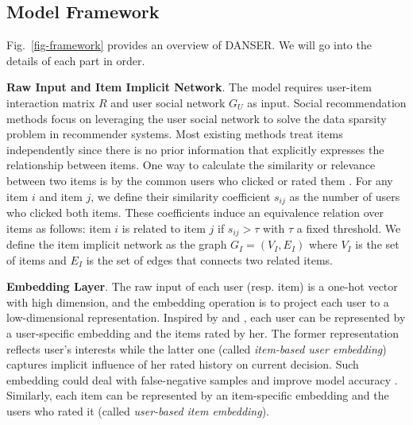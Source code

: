 \documentclass[sigconf]{acmart}
\begin{document}
\subsection{Model Framework}

Fig.~\ref{fig-framework} provides an overview of DANSER.
We will go into the details of each part in order.

\textbf{Raw Input and Item Implicit Network}. 
The model requires user-item interaction matrix $R$ and user social network $G_U$ as input. 
Social recommendation methods focus on leveraging the user social network to solve the data sparsity problem in recommender systems. 
Most existing methods treat items independently since there is no prior information that explicitly expresses the relationship between items. 
One way to calculate the similarity or relevance between two items is by the common users who clicked or rated them \cite{item-based}. 
For any item $i$ and item $j$, we define their similarity coefficient $s_{ij}$ as the number of users who clicked both items.  
These coefficients induce an equivalence relation over items as follows: item $i$ is related to item $j$ if $s_{ij}>\tau$ with $\tau$ a fixed threshold.
We define the item implicit network as the graph $G_I=(V_I, E_I)$ where $V_I$ is the set of items and $E_I$ is the set of edges that connects two related items. 


\textbf{Embedding Layer}. {The raw input of each user (resp. item) is a one-hot vector with high dimension, and the embedding operation is to project each user to a low-dimensional representation.} Inspired by \cite{SVD++} and \cite{DELF}, each user can be represented by a user-specific embedding and the items rated by her. The former representation reflects user's interests while the latter one (called \textit{item-based user embedding}) captures implicit influence of her rated history on current decision. Such embedding could deal with false-negative samples and improve model accuracy \cite{SVD++}. 
Similarly, each item can be represented by an item-specific embedding and the users who rated it (called \textit{user-based item embedding}).
\end{document}
